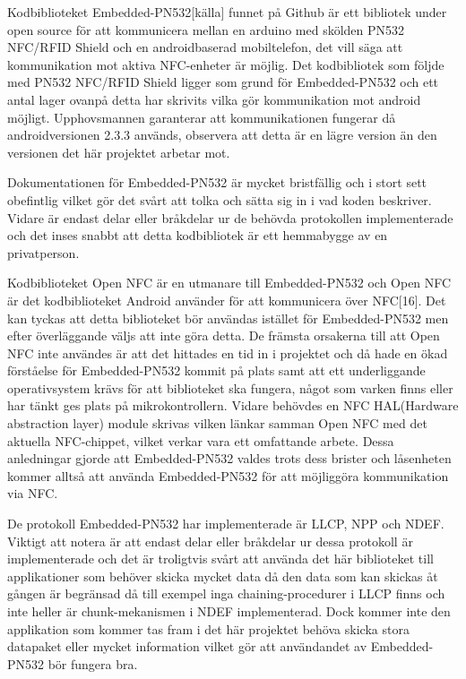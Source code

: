 \documentclass[11pt]{article}
\begin{document}
Kodbiblioteket Embedded-PN532[källa] funnet på Github är ett bibliotek under open source för att kommunicera mellan en arduino med skölden PN532 NFC/RFID Shield och en androidbaserad mobiltelefon, det vill säga att kommunikation mot aktiva NFC-enheter är möjlig. Det kodbibliotek som följde med PN532 NFC/RFID Shield ligger som grund för Embedded-PN532 och ett antal lager ovanpå detta har skrivits vilka gör kommunikation mot android möjligt. Upphovsmannen garanterar att kommunikationen fungerar då androidversionen 2.3.3 används, observera att detta är en lägre version än den versionen det här projektet arbetar mot. 

Dokumentationen för Embedded-PN532 är mycket bristfällig och i stort sett obefintlig vilket gör det svårt att tolka och sätta sig in i vad koden beskriver. Vidare är endast delar eller bråkdelar ur de behövda protokollen implementerade och det inses snabbt att detta kodbibliotek är ett hemmabygge av en privatperson. 

Kodbiblioteket Open NFC är en utmanare till Embedded-PN532 och Open NFC är det kodbiblioteket Android använder för att kommunicera över NFC[16]. Det kan tyckas att detta biblioteket bör användas istället för Embedded-PN532 men efter överläggande väljs att inte göra detta. De främsta orsakerna till att Open NFC inte användes är att det hittades en tid in i projektet och då hade en ökad förståelse för Embedded-PN532 kommit på plats samt att ett underliggande operativsystem krävs för att biblioteket ska fungera, något som varken finns eller har tänkt ges plats på mikrokontrollern. Vidare behövdes en NFC HAL(Hardware abstraction layer) module skrivas vilken länkar samman Open NFC med det aktuella NFC-chippet, vilket verkar vara ett omfattande arbete. Dessa anledningar gjorde att Embedded-PN532 valdes trots dess brister och låsenheten kommer alltså att använda Embedded-PN532 för att möjliggöra kommunikation via NFC.

De protokoll Embedded-PN532 har implementerade är LLCP, NPP och NDEF. Viktigt att notera är att endast delar eller bråkdelar ur dessa protokoll är implementerade och det är troligtvis svårt att använda det här biblioteket till applikationer som behöver skicka mycket data då den data som kan skickas åt gången är begränsad då till exempel inga chaining-procedurer i LLCP finns och inte heller är chunk-mekanismen i NDEF implementerad. Dock kommer inte den applikation som kommer tas fram i det här projektet behöva skicka stora datapaket eller mycket information vilket gör att användandet av Embedded-PN532 bör fungera bra.
\end{document}
